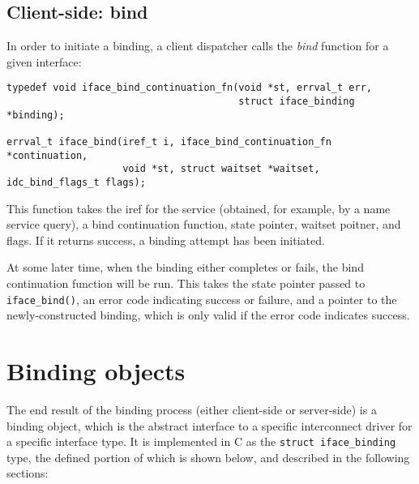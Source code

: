 \documentclass[a4paper,twoside]{report} %
\begin{document}
\subsection{Client-side: bind}

In order to initiate a binding, a client dispatcher calls the \emph{bind}
function for a given interface:

\begin{lstlisting}
typedef void iface_bind_continuation_fn(void *st, errval_t err,
                                        struct iface_binding *binding);

errval_t iface_bind(iref_t i, iface_bind_continuation_fn *continuation,
                    void *st, struct waitset *waitset, idc_bind_flags_t flags);
\end{lstlisting}

This function takes the iref for the service (obtained, for example, by a name
service query), a bind continuation function, state pointer, waitset poitner,
and flags. If it returns success, a binding attempt has been initiated.

At some later time, when the binding either completes or fails, the bind
continuation function will be run. This takes the state pointer passed to
\lstinline+iface_bind()+, an error code indicating success or failure, and a
pointer to the newly-constructed binding, which is only valid if the error code
indicates success.

\section{Binding objects}\label{sec:binding_objs}

The end result of the binding process (either client-side or server-side) is a
binding object, which is the abstract interface to a specific interconnect
driver for a specific interface type. It is implemented in C as the
\lstinline+struct iface_binding+ type, the defined portion of which is shown
below, and described in the following sections:
\end{document}

